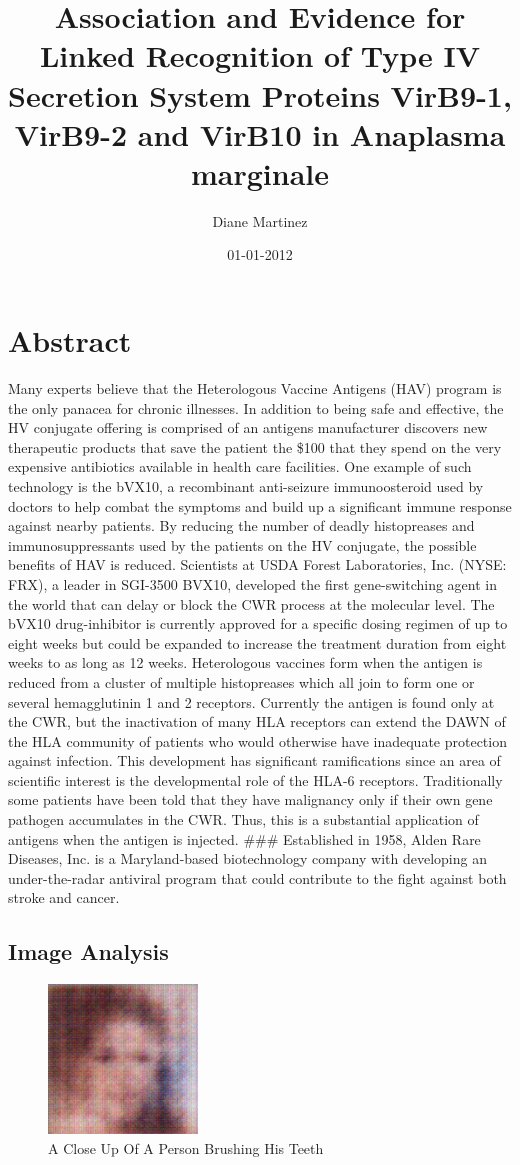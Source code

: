 \documentclass{article}%
\title{Association and Evidence for Linked Recognition of Type IV Secretion System Proteins VirB9{-}1, VirB9{-}2 and VirB10 in Anaplasma marginale}%
\author{Diane Martinez}%
\affil{Department of Cancer Biology and,}%
\date{01{-}01{-}2012}%
\begin{document}
%
\normalsize%
\maketitle%
\section{Abstract}%
\label{sec:Abstract}%
Many experts believe that the Heterologous Vaccine Antigens (HAV) program is the only panacea for chronic illnesses. In addition to being safe and effective, the HV conjugate offering is comprised of an antigens manufacturer discovers new therapeutic products that save the patient the \$100 that they spend on the very expensive antibiotics available in health care facilities.\newline%
One example of such technology is the bVX10, a recombinant anti{-}seizure immunoosteroid used by doctors to help combat the symptoms and build up a significant immune response against nearby patients. By reducing the number of deadly histopreases and immunosuppressants used by the patients on the HV conjugate, the possible benefits of HAV is reduced. Scientists at USDA Forest Laboratories, Inc. (NYSE: FRX), a leader in SGI{-}3500 BVX10, developed the first gene{-}switching agent in the world that can delay or block the CWR process at the molecular level. The bVX10 drug{-}inhibitor is currently approved for a specific dosing regimen of up to eight weeks but could be expanded to increase the treatment duration from eight weeks to as long as 12 weeks.\newline%
Heterologous vaccines form when the antigen is reduced from a cluster of multiple histopreases which all join to form one or several hemagglutinin 1 and 2 receptors. Currently the antigen is found only at the CWR, but the inactivation of many HLA receptors can extend the DAWN of the HLA community of patients who would otherwise have inadequate protection against infection. This development has significant ramifications since an area of scientific interest is the developmental role of the HLA{-}6 receptors. Traditionally some patients have been told that they have malignancy only if their own gene pathogen accumulates in the CWR. Thus, this is a substantial application of antigens when the antigen is injected.\newline%
\#\#\#\newline%
Established in 1958, Alden Rare Diseases, Inc. is a Maryland{-}based biotechnology company with developing an under{-}the{-}radar antiviral program that could contribute to the fight against both stroke and cancer.

%
\subsection{Image Analysis}%
\label{subsec:ImageAnalysis}%


\begin{figure}[h!]%
\centering%
\includegraphics[width=150px]{500_fake_images/samples_5_163.png}%
\caption{A Close Up Of A Person Brushing His Teeth}%
\end{figure}

%
\end{document}
